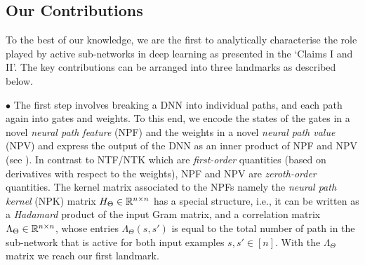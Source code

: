 \subsection{Our Contributions}\label{sec:contrib}
To the best of our knowledge, we are the first to analytically characterise the role played by active sub-networks in deep learning as presented in the `Claims I and II'.  The key contributions can be arranged into three landmarks as described below.

$\bullet$ The first step involves breaking a DNN into individual paths, and each path again into gates and weights.  To this end, we encode the states of the gates in a novel \emph{neural path feature} (NPF) and the weights in a novel \emph{neural path value} (NPV) and express the output of the DNN as an inner product of NPF and NPV (see ). In contrast to NTF/NTK which are \emph{first-order} quantities (based on derivatives with respect to the weights), NPF and NPV are \emph{zeroth-order} quantities. The kernel matrix associated to the NPFs namely the \emph{neural path kernel} (NPK) matrix $H_{\Theta}\in\mathbb{R}^{n\times n}$ has a special structure, i.e., it can be written as a \emph{Hadamard} product of the input Gram matrix, and a correlation matrix $\Lambda_{\Theta}\in\mathbb{R}^{n\times n}$, whose entries $\Lambda_{\Theta}(s,s')$ is equal to the total number of path in the sub-network that is active for both input examples $s,s'\in[n]$. With the $\Lambda_{\Theta}$ matrix we reach our first landmark.

